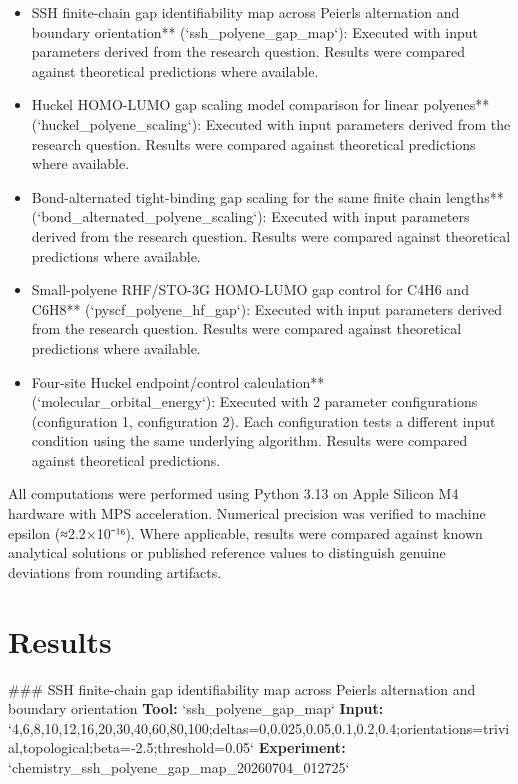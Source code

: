 \documentclass[11pt,a4paper]{article}
\begin{document}
\begin{itemize}
\item SSH finite-chain gap identifiability map across Peierls alternation and boundary orientation** (`ssh\_polyene\_gap\_map`): Executed with input parameters derived from the research question. Results were compared against theoretical predictions where available.
\item Huckel HOMO-LUMO gap scaling model comparison for linear polyenes** (`huckel\_polyene\_scaling`): Executed with input parameters derived from the research question. Results were compared against theoretical predictions where available.
\item Bond-alternated tight-binding gap scaling for the same finite chain lengths** (`bond\_alternated\_polyene\_scaling`): Executed with input parameters derived from the research question. Results were compared against theoretical predictions where available.
\item Small-polyene RHF/STO-3G HOMO-LUMO gap control for C4H6 and C6H8** (`pyscf\_polyene\_hf\_gap`): Executed with input parameters derived from the research question. Results were compared against theoretical predictions where available.
\item Four-site Huckel endpoint/control calculation** (`molecular\_orbital\_energy`): Executed with 2 parameter configurations (configuration 1, configuration 2). Each configuration tests a different input condition using the same underlying algorithm. Results were compared against theoretical predictions.
\end{itemize}
All computations were performed using Python 3.13 on Apple Silicon M4 hardware with MPS acceleration. Numerical precision was verified to machine epsilon (≈2.2×10⁻¹⁶). Where applicable, results were compared against known analytical solutions or published reference values to distinguish genuine deviations from rounding artifacts.


\section{Results}
\#\#\# SSH finite-chain gap identifiability map across Peierls alternation and boundary orientation
\textbf{Tool:} `ssh\_polyene\_gap\_map`
\textbf{Input:} `4,6,8,10,12,16,20,30,40,60,80,100;deltas=0,0.025,0.05,0.1,0.2,0.4;orientations=trivial,topological;beta=-2.5;threshold=0.05`
\textbf{Experiment:} `chemistry\_ssh\_polyene\_gap\_map\_20260704\_012725`
\end{document}
